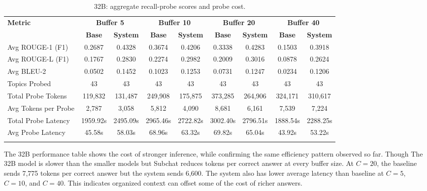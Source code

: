 \documentclass[pdflatex,sn-mathphys-num]{sn-jnl}%
\theoremstyle{thmstyleone}%
\theoremstyle{thmstyletwo}%
\theoremstyle{thmstylethree}%
\begin{document}
\begin{table}[htbp]
\caption{32B: aggregate recall-probe scores and probe cost.}\label{tab:32b_recall_main}
\centering
\scriptsize
\setlength{\tabcolsep}{3pt}
\begin{adjustbox}{width=\textwidth}
\begin{tabular}{lcccccccc}
\toprule
\textbf{Metric} & \multicolumn{2}{c}{\textbf{Buffer 5}} & \multicolumn{2}{c}{\textbf{Buffer 10}} & \multicolumn{2}{c}{\textbf{Buffer 20}} & \multicolumn{2}{c}{\textbf{Buffer 40}} \\
\cmidrule(lr){2-3}\cmidrule(lr){4-5}\cmidrule(lr){6-7}\cmidrule(lr){8-9}
 & \textbf{Base} & \textbf{System} & \textbf{Base} & \textbf{System} & \textbf{Base} & \textbf{System} & \textbf{Base} & \textbf{System} \\
\midrule
Avg ROUGE-1 (F1) & 0.2687 & 0.4328 & 0.3674 & 0.4206 & 0.3338 & 0.4283 & 0.1503 & 0.3918 \\
Avg ROUGE-L (F1) & 0.1767 & 0.2830 & 0.2274 & 0.2982 & 0.2009 & 0.3016 & 0.0878 & 0.2624 \\
Avg BLEU-2 & 0.0502 & 0.1452 & 0.1023 & 0.1253 & 0.0731 & 0.1247 & 0.0234 & 0.1206 \\
Topics Probed & 43 & 43 & 43 & 43 & 43 & 43 & 43 & 43 \\
Total Probe Tokens & 119,832 & 131,487 & 249,908 & 175,875 & 373,285 & 264,906 & 324,171 & 310,617 \\
Avg Tokens per Probe & 2,787 & 3,058 & 5,812 & 4,090 & 8,681 & 6,161 & 7,539 & 7,224 \\
Total Probe Latency & 1959.92s & 2495.09s & 2965.46s & 2722.82s & 3002.40s & 2796.51s & 1888.54s & 2288.25s \\
Avg Probe Latency & 45.58s & 58.03s & 68.96s & 63.32s & 69.82s & 65.04s & 43.92s & 53.22s \\
\botrule
\end{tabular}
\end{adjustbox}
\end{table}

The 32B performance table shows the cost of stronger inference, while confirming the same efficiency pattern observed so far. Though The 32B model is slower than the smaller models but Subchat  reduces tokens per correct answer at every buffer size. At $C=20$, the baseline sends 7,775 tokens per correct answer but the system sends 6,600. The system also has lower average latency than baseline at $C=5$, $C=10$, and $C=40$. This indicates organized context can offset some of the cost of richer answers.
\end{document}
